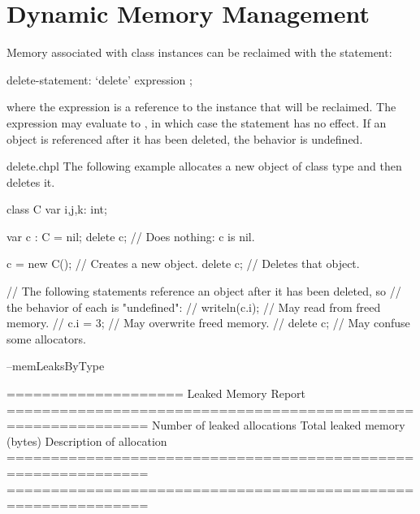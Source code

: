 \section{Dynamic Memory Management}
\label{Dynamic_Memory_Management}
\label{Class_Delete}

Memory associated with class instances can be reclaimed with the 
statement:

\begin{syntax}
delete-statement:
  `delete' expression ;
\end{syntax}

where the expression is a reference to the instance that will be reclaimed.
The expression may evaluate to , in which case the 
statement has no effect.  If an object is referenced after it has
been deleted, the behavior is undefined.

\begin{chapelexample}{delete.chpl}
The following example allocates a new object  of class type 
and then deletes it.
\begin{chapelpre}
class C {
  var i,j,k: int;
}
\end{chapelpre}
\begin{chapel}
var c : C = nil;
delete c;        // Does nothing: c is nil.

c = new C();     // Creates a new object.
delete c;        // Deletes that object.

// The following statements reference an object after it has been deleted, so
// the behavior of each is "undefined":
// writeln(c.i); // May read from freed memory.
// c.i = 3;      // May overwrite freed memory.
// delete c;     // May confuse some allocators.
\end{chapel}
\begin{chapelpost}
\end{chapelpost}
\begin{chapelexecopts}
--memLeaksByType
\end{chapelexecopts}
\begin{chapeloutput}

====================
Leaked Memory Report
==============================================================
Number of leaked allocations
           Total leaked memory (bytes)
                      Description of allocation
==============================================================
==============================================================
\end{chapeloutput}
\end{chapelexample}

